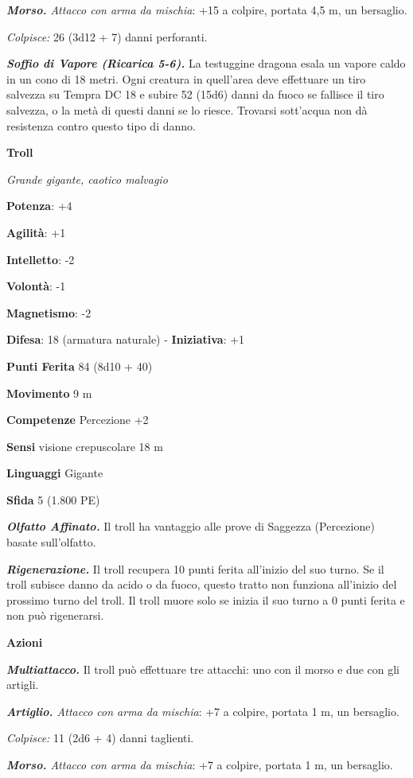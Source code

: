 \begin{multicols}{2}
\emph{\textbf{Morso.} Attacco con arma da mischia}: +15 a colpire,
portata 4,5 m, un bersaglio.

\emph{Colpisce:} 26 (3d12 + 7) danni perforanti.

\emph{\textbf{Soffio di Vapore (Ricarica 5-6).}} La testuggine dragona
esala un vapore caldo in un cono di 18 metri. Ogni creatura in
quell'area deve effettuare un tiro salvezza su Tempra DC 18 e
subire 52 (15d6) danni da fuoco se fallisce il tiro salvezza, o la metà
di questi danni se lo riesce. Trovarsi sott'acqua non dà resistenza
contro questo tipo di danno.

\textbf{Troll}

\emph{Grande gigante, caotico malvagio}

\textbf{Potenza}: +4

\textbf{Agilità}: +1

\textbf{Intelletto}: -2

\textbf{Volontà}: -1

\textbf{Magnetismo}: -2

\textbf{Difesa}: 18 (armatura naturale) - \textbf{Iniziativa}: +1

\textbf{Punti Ferita} 84 (8d10 + 40)

\textbf{Movimento} 9 m

\textbf{Competenze} Percezione +2

\textbf{Sensi} visione crepuscolare 18 m

\textbf{Linguaggi} Gigante

\textbf{Sfida} 5 (1.800 PE)\smallskip

\emph{\textbf{Olfatto Affinato.}} Il troll ha vantaggio alle prove di
Saggezza (Percezione) basate sull'olfatto.

\emph{\textbf{Rigenerazione.}} Il troll recupera 10 punti ferita
all'inizio del suo turno. Se il troll subisce danno da acido o da fuoco,
questo tratto non funziona all'inizio del prossimo turno del troll. Il
troll muore solo se inizia il suo turno a 0 punti ferita e non può
rigenerarsi.

\smallskip\textbf{Azioni}

\emph{\textbf{Multiattacco.}} Il troll può effettuare tre attacchi: uno
con il morso e due con gli artigli.

\emph{\textbf{Artiglio.} Attacco con arma da mischia}: +7 a colpire,
portata 1 m, un bersaglio.

\emph{Colpisce:} 11 (2d6 + 4) danni taglienti.

\emph{\textbf{Morso.} Attacco con arma da mischia}: +7 a colpire,
portata 1 m, un bersaglio.


\end{multicols}
